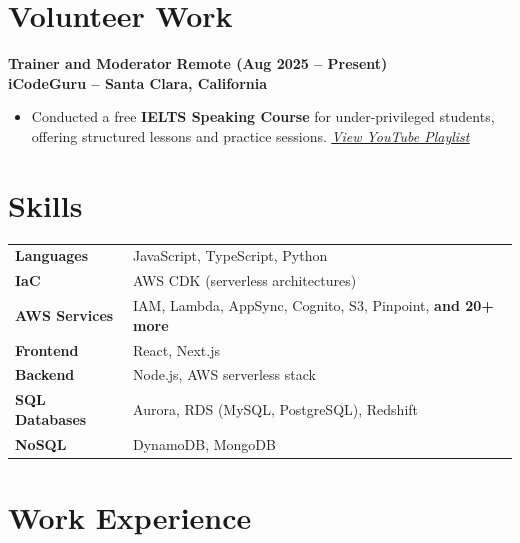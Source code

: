 \documentclass[a4paper,12pt]{article}
\begin{document}
\section*{Volunteer Work}

\textbf{Trainer and Moderator} \hfill \textbf{Remote (Aug 2025 -- Present)} \\
\textbf{iCodeGuru – Santa Clara, California}
\begin{itemize}
    \item Conducted a free \textbf{IELTS Speaking Course} for under-privileged students, offering structured lessons and practice sessions. \hfill \textit{\href{https://youtube.com/playlist?list=PLBXi_ryTbHgrKS_TljSEjycW0LwMTWfD3&si=ndIs0IgzNoVFCsPA}{\faLink \underline{View YouTube Playlist}}}
\end{itemize}

\section{Skills}
\begin{tabularx}{\linewidth}{@{}l X@{}}
\textbf{Languages} & JavaScript, TypeScript, Python \\
\textbf{IaC} & AWS CDK (serverless architectures) \\
\textbf{AWS Services} & IAM, Lambda, AppSync, Cognito, S3, Pinpoint, \textbf{and 20+ more} \\
\textbf{Frontend} & React, Next.js \\
\textbf{Backend} & Node.js, AWS serverless stack \\
\textbf{SQL Databases} & Aurora, RDS (MySQL, PostgreSQL), Redshift \\
\textbf{NoSQL} & DynamoDB, MongoDB \\
\end{tabularx}

\section*{Work Experience}
\vspace{2pt}
\end{document}
